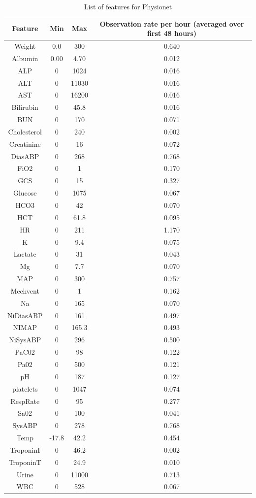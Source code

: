 \begin{table}[!ht]
    \centering
    \begin{tabular}{|c|c|c|c|} \hline 
         Feature&  Min&  Max& Observation rate per hour  (averaged over first 48 hours)\\ \hline 
         Weight&  0.0&  300& 0.640\\ \hline 
         Albumin&  0.00&  4.70& 0.012\\ \hline 
         ALP&  0&  1024& 0.016\\ \hline 
         ALT&  0&  11030& 0.016\\ \hline 
         AST&  0&  16200& 0.016\\ \hline 
         Bilirubin &  0&  45.8& 0.016\\ \hline 
         BUN&  0&  170& 0.071\\ \hline 
         Cholesterol&  0&  240& 0.002\\ \hline 
         Creatinine&  0&  16& 0.072\\ \hline 
 DiasABP& 0& 268&0.768\\ \hline 
 FiO2& 0& 1&0.170\\ \hline 
 GCS& 0& 15&0.327\\ \hline 
 Glucose& 0& 1075&0.067\\ \hline 
 HCO3& 0& 42&0.070\\ \hline 
 HCT& 0& 61.8&0.095\\ \hline 
 HR& 0& 211&1.170\\ \hline 
 K& 0& 9.4&0.075\\ \hline 
 Lactate& 0& 31&0.043\\ \hline 
 Mg& 0& 7.7&0.070\\ \hline 
 MAP& 0& 300&0.757\\ \hline 
 Mechvent& 0& 1&0.162\\ \hline 
 Na& 0& 165&0.070\\ \hline 
 NiDiasABP& 0& 161&0.497\\ \hline 
 NIMAP& 0& 165.3&0.493\\ \hline 
 NiSysABP& 0& 296&0.500\\ \hline 
 PaC02& 0& 98&0.122\\ \hline 
 Pa02& 0& 500&0.121\\ \hline 
 pH& 0& 187&0.127\\ \hline 
 platelets& 0& 1047&0.074\\ \hline 
 RespRate& 0& 95&0.277\\ \hline 
 Sa02& 0& 100&0.041\\ \hline 
 SysABP& 0& 278&0.768\\ \hline 
 Temp& -17.8& 42.2&0.454\\ \hline 
 TroponinI& 0& 46.2&0.002\\ \hline 
 TroponinT& 0& 24.9&0.010\\ \hline 
 Urine& 0& 11000&0.713\\ \hline 
 WBC& 0& 528&0.067\\ \hline
    \end{tabular}
    \caption{List of features for Physionet}
    \label{tab:physionet_features}
\end{table}